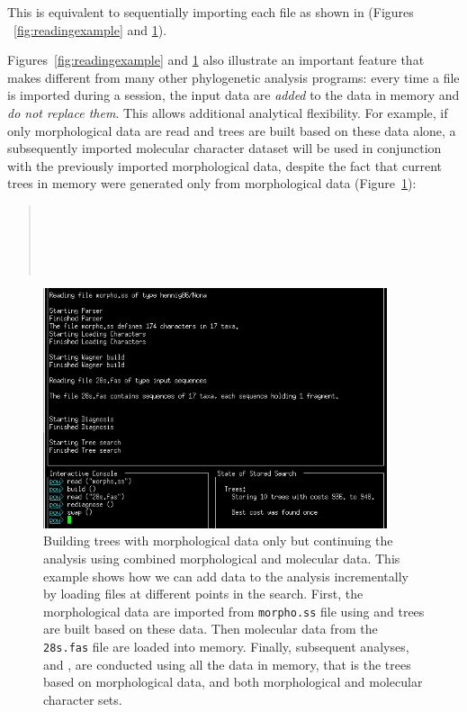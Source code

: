 {This is equivalent to sequentially importing each file as shown in
(Figures ~\ref{fig:readingexample} and \ref{fig:reading_example2}).

Figures~\ref{fig:readingexample} and \ref{fig:reading_example2}
also illustrate an important feature that makes \poy different from
many other phylogenetic analysis programs: every time a file is
imported during a \poy session, the input data are \emph{added} to
the data in memory and \emph{do not replace them}. This
allows additional analytical flexibility. For example, if only
morphological data are read and trees are built based on these data
alone, a subsequently imported molecular character dataset will be
used in conjunction with the previously imported morphological data,
despite the fact that current trees in memory were generated only
from morphological data (Figure~\ref{fig:reading_example2}):

\begin{quote}
\\
\\
\\
\\
\end{quote}

\begin{figure}[]
\begin{center}
\includegraphics[width=0.9\textwidth]{doc/figures/reading_example2.jpg}
\end{center}
\caption{Building trees with morphological data only but continuing
the analysis using combined morphological and molecular data. This
example shows how we can add data to the analysis incrementally by
loading files at different points in the search. First, the
morphological data are imported from \texttt{morpho.ss} file using
 and trees are built based on these data.
Then molecular data from the \texttt{28s.fas} file are loaded into
memory. Finally, subsequent analyses,  and
, are conducted using all the data in memory, that
is the trees based on morphological data, and both morphological
and molecular character sets.} \label{fig:reading_example2}
\end{figure}

}
